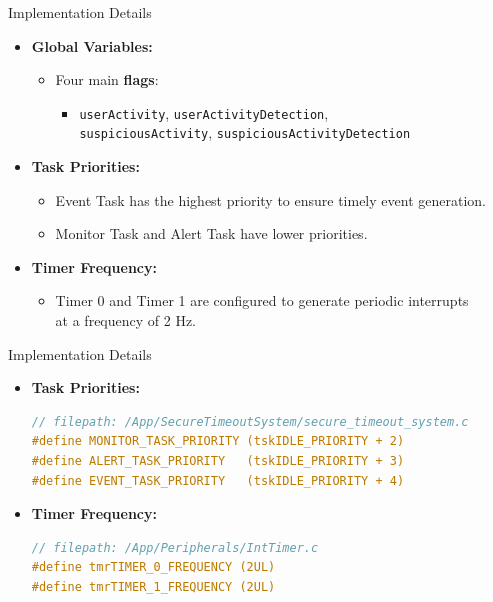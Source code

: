 \begin{frame}{Implementation Details}
    \begin{itemize}
        \item \textbf{Global Variables:}
            \begin{itemize}
                \item Four main \textbf{flags}:
                    \begin{itemize}
                        \item \texttt{userActivity}, \texttt{userActivityDetection}, \\ \texttt{suspiciousActivity}, \texttt{suspiciousActivityDetection}
                    \end{itemize}
            \end{itemize}
        \item \textbf{Task Priorities:}
            \begin{itemize}
                \item Event Task has the highest priority to ensure timely event generation.
                \item Monitor Task and Alert Task have lower priorities.
            \end{itemize}
        \item \textbf{Timer Frequency:}
            \begin{itemize}
                \item Timer 0 and Timer 1 are configured to generate periodic interrupts \\at a frequency of 2 Hz.
            \end{itemize}
    \end{itemize}
\end{frame}

\begin{frame}[fragile]{Implementation Details}
    \begin{itemize}
        \item \textbf{Task Priorities:}
            \begin{lstlisting}[language=C]
// filepath: /App/SecureTimeoutSystem/secure_timeout_system.c
#define MONITOR_TASK_PRIORITY (tskIDLE_PRIORITY + 2)
#define ALERT_TASK_PRIORITY   (tskIDLE_PRIORITY + 3)
#define EVENT_TASK_PRIORITY   (tskIDLE_PRIORITY + 4)
            \end{lstlisting}
        \item \textbf{Timer Frequency:}
            \begin{lstlisting}[language=C]
// filepath: /App/Peripherals/IntTimer.c
#define tmrTIMER_0_FREQUENCY (2UL)
#define tmrTIMER_1_FREQUENCY (2UL)
            \end{lstlisting}
    \end{itemize}
\end{frame}

